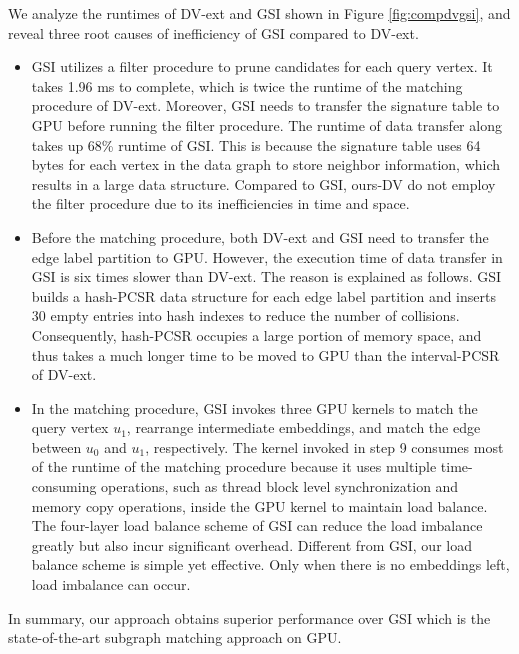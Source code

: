 We analyze the runtimes of DV-ext and GSI shown in Figure \ref{fig:compdvgsi}, and reveal three root causes of inefficiency of GSI compared to DV-ext.
\begin{itemize}
  \item GSI utilizes a filter procedure to prune candidates for each query vertex. It takes 1.96 ms to complete, which is twice the runtime of the matching procedure of DV-ext. Moreover, GSI needs to transfer the signature table to GPU before running the filter procedure. The runtime of data transfer along takes up 68\% runtime of GSI. This is because the signature table uses 64 bytes for each vertex in the data graph to store neighbor information, which results in a large data structure. Compared to GSI, ours-DV do not employ the filter procedure due to its inefficiencies in time and space.
  \item Before the matching procedure, both DV-ext and GSI need to transfer the edge label partition to GPU. However, the execution time of data transfer in GSI is six times slower than DV-ext. The reason is explained as follows. GSI builds a hash-PCSR data structure for each edge label partition and inserts 30 empty entries into hash indexes to reduce the number of collisions. Consequently, hash-PCSR occupies a large portion of memory space, and thus takes a much longer time to be moved to GPU than the interval-PCSR of DV-ext.
  \item In the matching procedure, GSI invokes three GPU kernels to match the query vertex $u_1$, rearrange intermediate embeddings, and match the edge between $u_0$ and $u_1$, respectively. The kernel invoked in step 9 consumes most of the runtime of the matching procedure because it uses multiple time-consuming operations, such as thread block level synchronization and memory copy operations, inside the GPU kernel to maintain load balance. The four-layer load balance scheme of GSI can reduce the load imbalance greatly but also incur significant overhead. Different from GSI, our load balance scheme is simple yet effective. Only when there is no embeddings left, load imbalance can occur.
\end{itemize}

In summary, our approach obtains superior performance over GSI which is the state-of-the-art subgraph matching approach on GPU.

